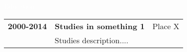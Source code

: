 
\newcommand{\EducationEntry}[5]{
\begin{tabular}{ l l r }
  \textbf{\textcolor{materialBlueDark}{#1-}}\textbf{\textcolor{materialBlue}{#2}}\hspace{20pt} & \textbf{#3} & {\small \textcolor{textLightGray}{#5}}\\
  	& \normalsize #4\\
\end{tabular}
\vspace*{10pt}
}

\LARGE
\noindent\colorbox{materialBlue}
{\parbox[c][25pt][c]{\textwidth}{\hspace{15pt}\textcolor{white}{Education}}} %

\large
\vspace*{10pt}
\EducationEntry{2000}{2014}{Studies in something 1}{Studies description....}{Place X}

\vspace*{5pt}